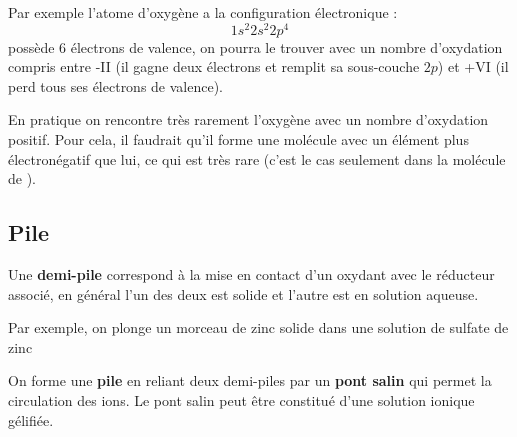 \documentclass{cours}
\begin{document}
Par exemple l'atome d'oxygène  a la configuration électronique :
\begin{equation}
  1s^2 2s^2 2p^4
\end{equation}
possède 6 électrons de valence, on pourra le trouver avec un nombre d'oxydation compris entre -II (il gagne deux électrons et remplit sa sous-couche $2p$) et +VI (il perd tous ses électrons de valence). 

En pratique on rencontre très rarement l'oxygène avec un nombre d'oxydation positif. Pour cela, il faudrait qu'il forme une molécule avec un élément plus électronégatif que lui, ce qui est très rare (c'est le cas seulement dans la molécule de ).

\subsection{Pile}%
\label{sub:pile}

Une \textbf{demi-pile} correspond à la mise en contact d'un oxydant avec le réducteur associé, en général l'un des deux est solide et l'autre est en solution aqueuse.

Par exemple, on plonge un morceau de zinc solide dans une solution de sulfate de zinc

\begin{center}
\end{center}

On forme une \textbf{pile} en reliant deux demi-piles par un \textbf{pont salin} qui permet la circulation des ions. Le pont salin peut être constitué d'une solution ionique gélifiée. 
\end{document}
